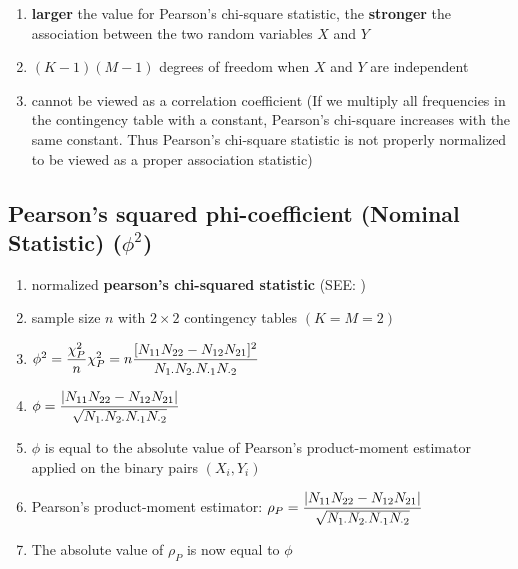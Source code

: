 \begin{enumerate}
    \item \textbf{larger} the value for Pearson’s chi-square statistic, the \textbf{stronger} the association between the two random variables $X$ and $Y$

    \item $(K - 1)(M - 1)$ degrees of freedom when $X$ and $Y$ are independent

    \item cannot be viewed as a correlation coefficient (If we multiply all frequencies in the contingency table with a constant, Pearson’s chi-square increases with the same constant. Thus Pearson’s chi-square statistic is not properly normalized to be viewed as a proper association statistic)

\end{enumerate}


\subsection{Pearson’s squared phi-coefficient (Nominal Statistic) ($\phi^2$) \cite{ism-1}} \label{Multivariate Distributions: Pearson’s squared phi-coefficient (Nominal Statistic)}

\begin{enumerate}
    \item normalized \textbf{pearson’s chi-squared statistic} (SEE: )

    \item sample size $n$ with $2 \times  2$ contingency tables $(K = M = 2)$

    \item $
        \hfill
        \phi^2 = \dfrac{\chi_P^2}{n}
        \hfill
        \chi_P^2 = n \dfrac{
            [N_{11}N_{22} - N_{12}N_{21}]^2
        }{
            N_{1\cdot}N_{2\cdot}N_{\cdot 1}N_{\cdot 2}
        }
        \hfill
    $

    \item $
        \hfill
        \phi = \dfrac{
            |N_{11}N_{22} - N_{12}N_{21}|
        }{
            \sqrt{N_{1\cdot}N_{2\cdot}N_{\cdot 1}N_{\cdot 2}}
        }
        \hfill
    $

    \item $\phi$ is equal to the absolute value of Pearson’s product-moment estimator applied on the binary pairs $(X_i, Y_i)$

    \item Pearson’s product-moment estimator: $
        \hfill
        \rho_P = \dfrac{
            |N_{11}N_{22} - N_{12}N_{21}|
        }{
            \sqrt{N_{1\cdot}N_{2\cdot}N_{\cdot 1}N_{\cdot 2}}
        }
        \hfill
    $

    \item The absolute value of $\rho_P$ is now equal to $\phi$
\end{enumerate}


